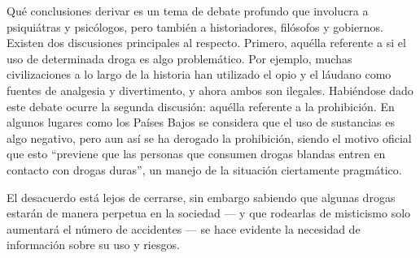 Qué conclusiones derivar es un tema de debate profundo que involucra a psiquiátras y psicólogos, pero también a historiadores, filósofos y gobiernos. Existen dos discusiones principales al respecto. Primero, aquélla referente a si el uso de determinada droga es algo problemático. Por ejemplo, muchas civilizaciones a lo largo de la historia han utilizado el opio y el láudano como fuentes de analgesia y divertimento, y ahora ambos son ilegales. Habiéndose dado este debate ocurre la segunda discusión: aquélla referente a la prohibición. En algunos lugares como los Países Bajos se considera que el uso de sustancias es algo negativo, pero aun así se ha derogado la prohibición, siendo el motivo oficial que esto \enquote{previene que las personas que consumen drogas blandas entren en contacto con drogas duras}, un manejo de la situación ciertamente pragmático.

El desacuerdo está lejos de cerrarse, sin embargo sabiendo que algunas drogas estarán de manera perpetua en la sociedad --- y que rodearlas de misticismo solo aumentará el número de accidentes --- se hace evidente la necesidad de información sobre su uso y riesgos.
